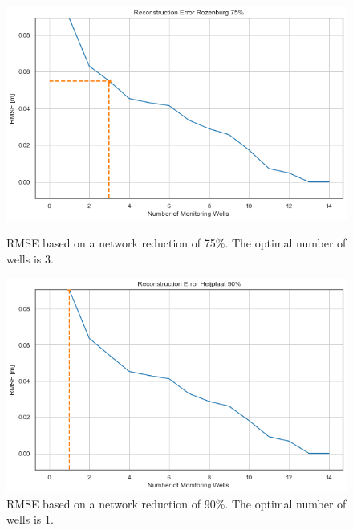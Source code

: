 \begin{figure}[htbp]
    \centering
    \begin{minipage}{0.45\linewidth}
        \includegraphics[width=\linewidth]{frontmatter/Heijplaat-fig/75heij.png}
        \caption{RMSE based on a network reduction of 75\%. The optimal number of wells is 3.}
        \label{heij75}
    \end{minipage}
    \hfill
    \begin{minipage}{0.45\linewidth}
        \includegraphics[width=\linewidth]{frontmatter/Heijplaat-fig/heij90.png}
        \caption{RMSE based on a network reduction of 90\%. The optimal number of wells is 1.}
        \label{heij90}
    \end{minipage}
\end{figure}


